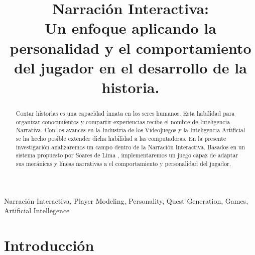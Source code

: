 \documentclass[conference]{IEEEtran}
\begin{document}
\title{Narración Interactiva: \\
Un enfoque aplicando la personalidad y el comportamiento del jugador en el desarrollo de la historia.}


\author{
}

\maketitle

\begin{abstract}

Contar historias es una capacidad innata en los seres humanos. Esta habilidad para organizar conocimientos y compartir  experiencias recibe el nombre de Inteligencia Narrativa. Con los avances en la Industria de los Videojuegos y la Inteligencia Artificial se ha hecho posible extender dicha habilidad a las computadoras. En la presente investigación analizaremos un campo dentro de la Narración Interactiva. Basados en un sistema propuesto por Soares de Lima \citep{de2018player}, implementaremos un juego capaz de adaptar sus mecánicas y líneas narrativas a el comportamiento y personalidad del jugador. 

\end{abstract}


\begin{IEEEkeywords} Narración Interactiva, Player Modeling, Personality, Quest Generation, Games, Artificial Intellegence\end{IEEEkeywords}


%
\IEEEpeerreviewmaketitle

\section{Introducción}
\end{document}
